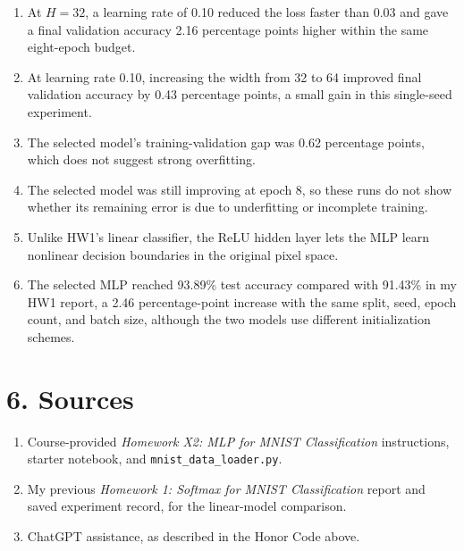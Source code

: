 \documentclass[a4paper,12pt]{article}
\providecommand{\tightlist}{%
  \setlength{\itemsep}{0.35em}\setlength{\parskip}{0pt}}
\begin{document}
\begin{enumerate}
\def\labelenumi{\arabic{enumi}.}
\tightlist
\item
  At \(H=32\), a learning rate of 0.10 reduced the loss faster than 0.03 and gave a final validation accuracy 2.16 percentage points higher within the same eight-epoch budget.
\item
  At learning rate 0.10, increasing the width from 32 to 64 improved final validation accuracy by 0.43 percentage points, a small gain in this single-seed experiment.
\item
  The selected model's training-validation gap was 0.62 percentage points, which does not suggest strong overfitting.
\item
  The selected model was still improving at epoch 8, so these runs do not show whether its remaining error is due to underfitting or incomplete training.
\item
  Unlike HW1's linear classifier, the ReLU hidden layer lets the MLP learn nonlinear decision boundaries in the original pixel space.
\item
  The selected MLP reached 93.89\% test accuracy compared with 91.43\% in my HW1 report, a 2.46 percentage-point increase with the same split, seed, epoch count, and batch size, although the two models use different initialization schemes.
\end{enumerate}

\section*{6. Sources}

\begin{enumerate}
\def\labelenumi{\arabic{enumi}.}
\tightlist
\item
  Course-provided \emph{Homework X2: MLP for MNIST Classification} instructions, starter notebook, and \texttt{mnist\_data\_loader.py}.
\item
  My previous \emph{Homework 1: Softmax for MNIST Classification} report and saved experiment record, for the linear-model comparison.
\item
  ChatGPT assistance, as described in the Honor Code above.
\end{enumerate}
\end{document}
